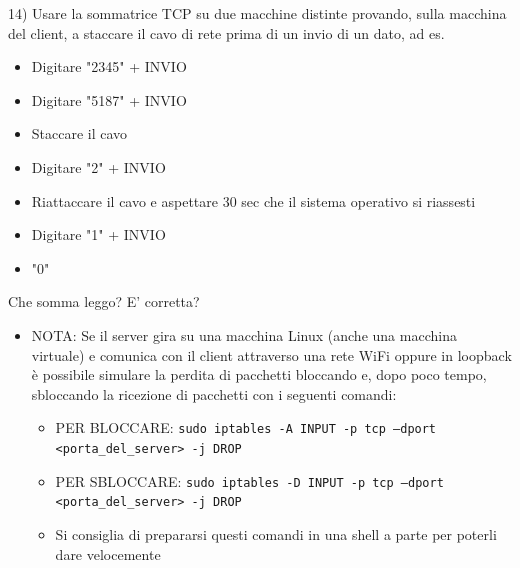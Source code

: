 \documentclass[11pt]{article}
\begin{document}
\begin{tcolorbox}[colback=blue!5!white,colframe=blue!75!black,title=\textbf{DOMANDA}, breakable]
14) Usare la sommatrice TCP su due macchine distinte provando, sulla macchina del client, a staccare il cavo di rete prima di un invio di un dato, ad es.
\begin{itemize}
    \item Digitare "2345" + INVIO
    \item Digitare "5187" + INVIO
    \item Staccare il cavo
    \item Digitare "2" + INVIO
    \item Riattaccare il cavo e aspettare 30 sec che il sistema operativo si riassesti
    \item Digitare "1" + INVIO
    \item "0"
\end{itemize}
Che somma leggo? E' corretta?
\begin{itemize}
    \item NOTA: Se il server gira su una macchina Linux (anche una macchina virtuale) e comunica con il client attraverso una rete WiFi oppure in loopback è possibile simulare la perdita di pacchetti bloccando e, dopo poco tempo, sbloccando la ricezione di pacchetti con i seguenti comandi:
    \begin{itemize}
        \item PER BLOCCARE: \texttt{sudo iptables -A INPUT -p tcp --dport <porta\_del\_server> -j DROP}
        \item PER SBLOCCARE: \texttt{sudo iptables -D INPUT -p tcp --dport <porta\_del\_server> -j DROP}
        \item Si consiglia di prepararsi questi comandi in una shell a parte per poterli dare velocemente
    \end{itemize}
\end{itemize}
\end{tcolorbox}
\end{document}

